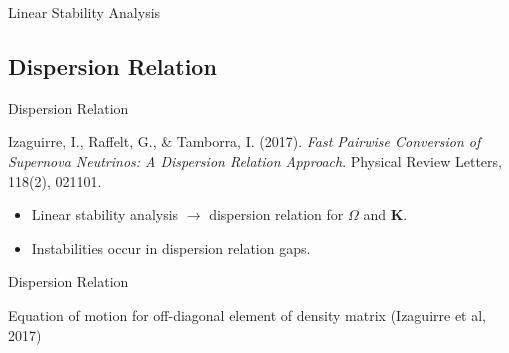 \documentclass[9pt]{beamer}
\begin{document}
\begin{darkframes}
\begin{frame}{Linear Stability Analysis}
\begin{tcolorbox}
 \end{tcolorbox}
\end{frame}






\subsection{Dispersion Relation}


\begin{frame}{ Dispersion Relation }

    \begin{tcolorbox}[standard jigsaw,opacityback=0]
        \color{white}
        Izaguirre, I., Raffelt, G., \& Tamborra, I. (2017). \emph{Fast Pairwise Conversion of Supernova Neutrinos: A Dispersion Relation Approach}. Physical Review Letters, 118(2), 021101.
    \end{tcolorbox}


    \begin{itemize}[<+->]
        \item Linear stability analysis $\rightarrow$ dispersion relation for $\Omega$ and $\mathbf K$.
        \item Instabilities occur in dispersion relation gaps.
    \end{itemize}

    \end{frame}


\begin{frame}{Dispersion Relation}

Equation of motion for off-diagonal element of density matrix (Izaguirre et al, 2017)






\end{frame}
\end{darkframes}
\end{document}
